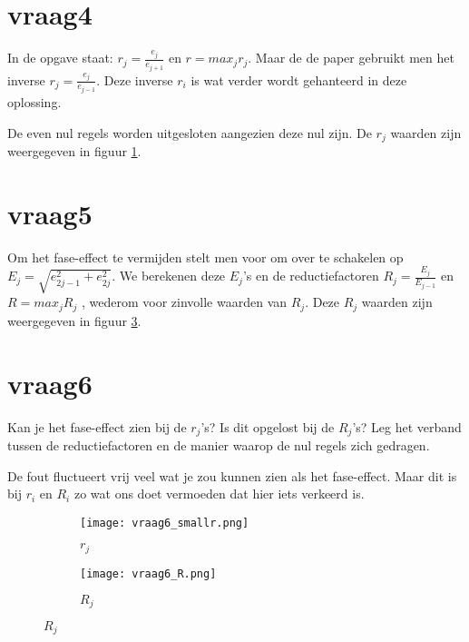 \documentclass[11pt]{article} %
\begin{document}
\section{vraag4}
In de opgave staat: $r_{j} = \frac{e_{j}}{e_{j+1}}$ en $r = max_{j} r_{j}$. Maar de de paper gebruikt men het inverse  $r_{j} = \frac{e_{j}}{e_{j-1}}$. Deze inverse $r_i$ is wat verder wordt gehanteerd in deze oplossing.

De even nul regels worden uitgesloten aangezien deze nul zijn. De $r_{j}$ waarden zijn weergegeven in figuur \ref{fig:oef6a}.
\section{vraag5}
Om het fase-effect te vermijden stelt men voor om over te schakelen op $E_{j} = \sqrt{e_{2j-1}^{2}+e_{2j}^{2}}$. We berekenen deze $E_{j}$’s en de reductiefactoren $R_{j} = \frac{E_{j}}{E_{j-1}}$ en $R = max_{j} R_{j}$ , wederom voor zinvolle waarden van $R_{j}$. Deze $R_{j}$ waarden zijn weergegeven in figuur \ref{fig:oef6b}.
\section{vraag6}


Kan je het fase-effect zien bij de $r_{j}$’s? Is dit
opgelost bij de $R_{j}$’s? Leg het verband tussen de reductiefactoren en de manier waarop de nul regels zich gedragen. 

De fout fluctueert vrij veel wat je zou kunnen zien als het fase-effect. Maar dit is bij $r_i$ en $R_i$ zo wat ons doet vermoeden dat hier iets verkeerd is.

\begin{figure}[H]
	\centering
	\begin{subfigure}[b]{0.45\textwidth}
		\texttt{[image: vraag6\_smallr.png]}
		\caption{$r_j$}
		\label{fig:oef6a}
	\end{subfigure}
	\begin{subfigure}[b]{0.45\textwidth}
		\texttt{[image: vraag6\_R.png]}
		\caption{$R_j$}
		\label{fig:oef6b}
	\end{subfigure}
\end{figure}


\end{document}
